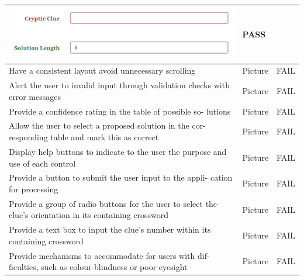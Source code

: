 \begin{landscape}
\begin{longtable}{|L{5cm}|L{15cm}|C{2cm}|}
\includegraphics[keepaspectratio=true]{evidence/alert3.png}
 & PASS \\ \hline
Have a consistent layout avoid unnecessary scrolling
    & Picture & FAIL \\ \hline
Alert the user to invalid input through validation checks
with error messages
    & Picture & FAIL \\ \hline
Provide a confidence rating in the table of possible so-
lutions
    & Picture & FAIL \\ \hline
Allow the user to select a proposed solution in the cor-
responding table and mark this as correct
    & Picture & FAIL \\ \hline
Display help buttons to indicate to the user the purpose
and use of each control
    & Picture & FAIL \\ \hline
Provide a button to submit the user input to the appli-
cation for processing
    & Picture & FAIL \\ \hline
Provide a group of radio buttons for the user to select
the clue's orientation in its containing crossword
    & Picture & FAIL \\ \hline
Provide a text box to input the clue's number within its
containing crossword
    & Picture & FAIL \\ \hline
Provide mechanisms to accommodate for users with dif-
ficulties, such as colour-blindness or poor eyesight
    & Picture & FAIL \\ \hline
  \end{longtable}
\end{landscape}